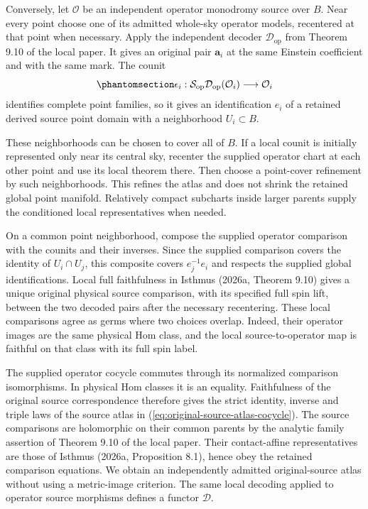 \documentclass[
  english,
  11pt,
  reqno]{amsart}
\begin{document}
Conversely, let \(\mathcal O\) be an independent operator monodromy
source over \(B\). Near every point choose one of its admitted whole-sky
operator models, recentered at that point when necessary. Apply the
independent decoder \(\mathcal D_{\mathrm{op}}\) from Theorem 9.10 of
the local paper. It gives an original pair \(\mathbf a_i\) at the same
Einstein coefficient and with the same mark. The counit
\begin{equation}\protect\phantomsection\label{eq:source-atlas-local-operator-counit}{
\epsilon_i:\mathcal S_{\mathrm{op}}\mathcal D_{\mathrm{op}}(\mathcal O_i)
\longrightarrow\mathcal O_i
}\end{equation} identifies complete point families, so it gives an
identification \(e_i\) of a retained derived source point domain with a
neighborhood \(U_i\subset B\).

These neighborhoods can be chosen to cover all of \(B\). If a local
counit is initially represented only near its central sky, recenter the
supplied operator chart at each other point and use its local theorem
there. Then choose a point-cover refinement by such neighborhoods. This
refines the atlas and does not shrink the retained global point
manifold. Relatively compact subcharts inside larger parents supply the
conditioned local representatives when needed.

On a common point neighborhood, compose the supplied operator comparison
with the counits and their inverses. Since the supplied comparison
covers the identity of \(U_i\cap U_j\), this composite covers
\(e_j^{-1}e_i\) and respects the supplied global identifications. Local
full faithfulness in Isthmus (2026a, Theorem 9.10) gives a unique
original physical source comparison, with its specified full spin lift,
between the two decoded pairs after the necessary recentering. These
local comparisons agree as germs where two choices overlap. Indeed,
their operator images are the same physical Hom class, and the local
source-to-operator map is faithful on that class with its full spin
label.

The supplied operator cocycle commutes through its normalized comparison
isomorphisms. In physical Hom classes it is an equality. Faithfulness of
the original source correspondence therefore gives the strict identity,
inverse and triple laws of the source atlas in
(\ref{eq:original-source-atlas-cocycle}). The source comparisons are
holomorphic on their common parents by the analytic family assertion of
Theorem 9.10 of the local paper. Their contact-affine representatives
are those of Isthmus (2026a, Proposition 8.1), hence obey the retained
comparison equations. We obtain an independently admitted
original-source atlas without using a metric-image criterion. The same
local decoding applied to operator source morphisms defines a functor
\(\mathcal D\).
\end{document}
